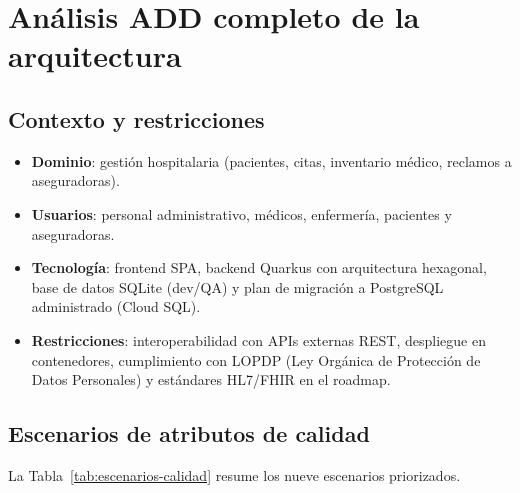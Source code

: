 \documentclass[12pt,letterpaper]{article}
\begin{document}
\section{Análisis ADD completo de la arquitectura}
\subsection{Contexto y restricciones}
\begin{itemize}[leftmargin=1.2cm]
  \item \textbf{Dominio}: gestión hospitalaria (pacientes, citas, inventario médico, reclamos a aseguradoras).
  \item \textbf{Usuarios}: personal administrativo, médicos, enfermería, pacientes y aseguradoras.
  \item \textbf{Tecnología}: frontend SPA, backend Quarkus con arquitectura hexagonal, base de datos SQLite (dev/QA) y plan de migración a PostgreSQL administrado (Cloud SQL).
  \item \textbf{Restricciones}: interoperabilidad con APIs externas REST, despliegue en contenedores, cumplimiento con LOPDP (Ley Orgánica de Protección de Datos Personales) y estándares HL7/FHIR en el roadmap.
\end{itemize}

\subsection{Escenarios de atributos de calidad}
\label{subsec:escenarios-calidad}
La Tabla~\ref{tab:escenarios-calidad} resume los nueve escenarios priorizados.
\end{document}

